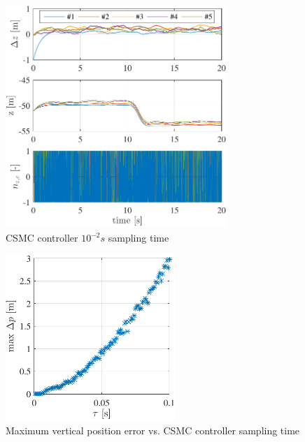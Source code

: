 \documentclass{ifacconf}
\begin{document}
\begin{figure}
\begin{center}
\includegraphics[width=8.4cm]{STSMC-100Hz-TIMESCALESEPARATION-turbulence=1}    %
\caption{ CSMC controller $10^{-2} s$ sampling time} 
\label{fig:CSMC100Hz}
\end{center}
\end{figure}

\begin{figure}
\begin{center}
\includegraphics[width=6.4cm]{stsmc-maxerror-z-samplingtime}    %
\caption{Maximum vertical position error vs. CSMC controller sampling time} 
\label{fig:bifurcation}
\end{center}
\end{figure}

\end{document}
